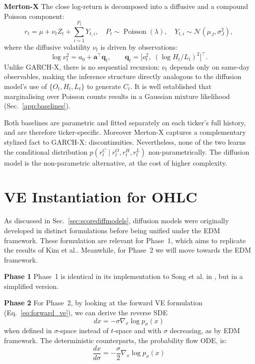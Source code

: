 \textbf{Merton-X} \quad The close log-return is decomposed into a diffusive and a compound Poisson
component:
\[
    \label{eq:mertonx_return}
    r_t = \mu + \nu_t Z_t + \sum_{i=1}^{P_t} Y_{t,i}, \quad
    P_t \sim \operatorname{Poisson}(\lambda), \quad
    Y_{t,i} \sim \mathcal{N}(\mu_J, \sigma_J^2),
\]
where the diffusive volatility $\nu_t$ is driven by observations:
\begin{equation}
    \label{eq:mertonx_logvar}
    \log \nu_t^2 = a_0 + \mathbf{a}^\top \mathbf{q}_t, \qquad
    \mathbf{q}_t = \bigl[o_t^2,\; (\log H_t/L_t)^2\bigr]^\top.
\end{equation}
Unlike GARCH-X, there is no sequential recursion: $\nu_t$ depends only on
same-day observables, making the inference structure directly analogous to the
diffusion model's use of $\{O_t, H_t, L_t\}$ to generate $C_t$.
It is well established that marginalising over Poisson counts results in a Gaussian mixture likelihood (Sec.\ \ref{app:baselines}). 

Both baselines are parametric and fitted separately on each ticker's full history, and are therefore ticker-specific. Moreover Merton-X captures a complementary stylized fact to GARCH-X: discontinuities. Nevertheless, none of the two learns the conditional distribution $p(r_t^C \mid r_t^O, r_t^H, r_t^L)$ non-parametrically. The diffusion model is the non-parametric alternative,
at the cost of higher complexity.

\section{VE Instantiation for OHLC}
As discussed in Sec.\ \ref{sec:scorediffmodels}, diffusion models were 
originally developed in distinct formulations before being unified under 
the EDM framework. These formulation are relevant for Phase~1, which aims to replicate the results of Kim et al.\cite{kim2025diffusion}. Meanwhile, for Phase~2 we will move towards the EDM framework.

\textbf{Phase 1} \quad Phase~1 is identical in its implementation to Song et al. in \cite{song2021score}, but in a simplified version.

\textbf{Phase 2} \quad For Phase~2, by looking at the forward VE formulation (Eq.\ \ref{eq:forward_ve}), we can derive the reverse SDE\[dx=-\sigma\nabla_x \log p_\sigma(x)\] when defined in \(\sigma\)-space instead of \(t\)-space and with \(\sigma\) decreasing, as by EDM framework. The deterministic counterparts, the probability flow ODE, is:
\[
\frac{dx}{d\sigma}=-\frac{\sigma}{2}\nabla_x\log p_\sigma(x)
\]

